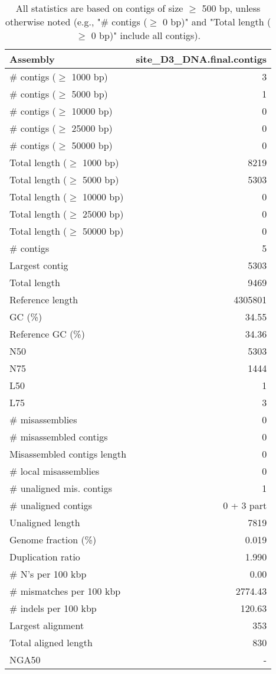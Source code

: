 \documentclass[12pt,a4paper]{article}
\begin{document}
\begin{table}[ht]
\begin{center}
\caption{All statistics are based on contigs of size $\geq$ 500 bp, unless otherwise noted (e.g., "\# contigs ($\geq$ 0 bp)" and "Total length ($\geq$ 0 bp)" include all contigs).}
\begin{tabular}{|l*{1}{|r}|}
\hline
Assembly & site\_D3\_DNA.final.contigs \\ \hline
\# contigs ($\geq$ 1000 bp) & 3 \\ \hline
\# contigs ($\geq$ 5000 bp) & 1 \\ \hline
\# contigs ($\geq$ 10000 bp) & 0 \\ \hline
\# contigs ($\geq$ 25000 bp) & 0 \\ \hline
\# contigs ($\geq$ 50000 bp) & 0 \\ \hline
Total length ($\geq$ 1000 bp) & 8219 \\ \hline
Total length ($\geq$ 5000 bp) & 5303 \\ \hline
Total length ($\geq$ 10000 bp) & 0 \\ \hline
Total length ($\geq$ 25000 bp) & 0 \\ \hline
Total length ($\geq$ 50000 bp) & 0 \\ \hline
\# contigs & 5 \\ \hline
Largest contig & 5303 \\ \hline
Total length & 9469 \\ \hline
Reference length & 4305801 \\ \hline
GC (\%) & 34.55 \\ \hline
Reference GC (\%) & 34.36 \\ \hline
N50 & 5303 \\ \hline
N75 & 1444 \\ \hline
L50 & 1 \\ \hline
L75 & 3 \\ \hline
\# misassemblies & 0 \\ \hline
\# misassembled contigs & 0 \\ \hline
Misassembled contigs length & 0 \\ \hline
\# local misassemblies & 0 \\ \hline
\# unaligned mis. contigs & 1 \\ \hline
\# unaligned contigs & 0 + 3 part \\ \hline
Unaligned length & 7819 \\ \hline
Genome fraction (\%) & 0.019 \\ \hline
Duplication ratio & 1.990 \\ \hline
\# N's per 100 kbp & 0.00 \\ \hline
\# mismatches per 100 kbp & 2774.43 \\ \hline
\# indels per 100 kbp & 120.63 \\ \hline
Largest alignment & 353 \\ \hline
Total aligned length & 830 \\ \hline
NGA50 & - \\ \hline
\end{tabular}
\end{center}
\end{table}
\end{document}
